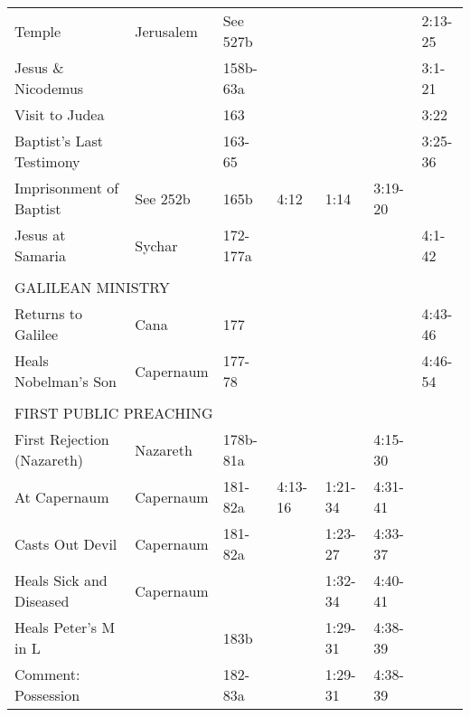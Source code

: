 \begin{longtable}[h]{lllllll}
\quad Temple                       & Jerusalem           & See 527b   &                 &                 &                      & 2:13-25 \\
Jesus \& Nicodemus                 &                     & 158b-63a   &                 &                 &                      & 3:1-21 \\
Visit to Judea                     &                     & 163        &                 &                 &                      & 3:22 \\
Baptist's Last Testimony           &                     & 163-65     &                 &                 &                      & 3:25-36 \\
\quad Imprisonment of Baptist      & See 252b            & 165b       & 4:12            & 1:14            & 3:19-20              & \\
Jesus at Samaria                   & Sychar              & 172-177a   &                 &                 &                      & 4:1-42 \\
\\
\multicolumn{7}{l}{GALILEAN MINISTRY} \\
Returns to Galilee                 & Cana                & 177        &                 &                 &                      & 4:43-46 \\
Heals Nobelman's Son               & Capernaum           & 177-78     &                 &                 &                      & 4:46-54 \\
\\
\multicolumn{7}{l}{FIRST PUBLIC PREACHING} \\
First Rejection (Nazareth)         & Nazareth            & 178b-81a   &                 &                 & 4:15-30              & \\
At Capernaum                       & Capernaum           & 181-82a    & 4:13-16         & 1:21-34         & 4:31-41              & \\
\quad Casts Out Devil              & Capernaum           & 181-82a    &                 & 1:23-27         & 4:33-37              & \\
\quad Heals Sick and Diseased      & Capernaum           &            &                 & 1:32-34         & 4:40-41              & \\
\quad Heals Peter's M in L         &                     & 183b       &                 & 1:29-31         & 4:38-39              & \\
Comment: Possession                &                     & 182-83a    &                 & 1:29-31         & 4:38-39              & \\

\end{longtable}
